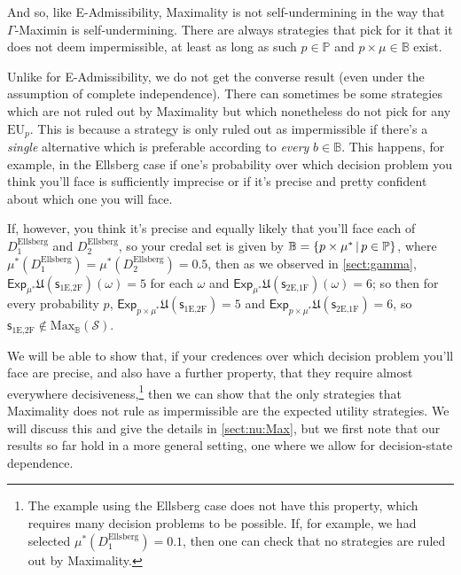 \documentclass[a4paper]{article}
\renewcommand\P{\mathbb{P}} %
\newcommand\Exp{\mathsf{Exp}}
\newcommand\EU{\mathrm{EU}}
\newcommand\U{\mathfrak{U}} %
\newcommand\Maximality{\mathrm{Max}}
\renewcommand\S{\mathcal{S}}
\newcommand\s{\mathsf{s}}
\newcommand{\IB}{\mathbb{B}}
\newcommand{\IP}{\P}
\renewcommand{\color}[1]{}
\newenvironment{colored}[1]{\leavevmode\color{#1}}{}
\newcommand{\Strategies}{\S}
\newcommand\SetDelimiter[1][]{
	\nonscript\,#1\vert \allowbreak \nonscript\,\mathopen{}}
\providecommand\given{\SetDelimiter}
\newenvironment{CCM rewritten}
{\begingroup\color{blue}} %
{\endgroup}              %
\begin{document}
And so, like E-Admissibility, Maximality is not self-undermining in the way that $\Gamma$-Maximin is self-undermining. There are always strategies that pick for it that it does not deem impermissible, %
	at least as long as such $p\in\IP$ and $p\times\mu\in\IB$ exist.

Unlike for E-Admissibility, we do not get the converse result (even under the assumption of complete independence). There can sometimes be some strategies which are not ruled out by Maximality but which nonetheless do not pick for any $\EU_p$. This is because a strategy is only ruled out as impermissible if there's a \emph{single} alternative which is preferable according to \emph{every} $b\in \IB$. 
This happens, for example, in the Ellsberg case if one's probability over which decision problem you think you'll face is sufficiently imprecise or if it's precise and pretty confident about which one you will face. 

If, however, you think it's precise and equally likely that you'll face each of $D^{\mathrm{Ellsberg}}_1$ and $D^{\mathrm{Ellsberg}}_2$, so your credal set is given by $\IB=\{p\times\mu^*\given p\in\IP\}$, where $\mu^*(D^{\mathrm{Ellsberg}}_1)=\mu^*(D^{\mathrm{Ellsberg}}_2)=0.5$, then as we observed in \cref{sect:gamma}, $\Exp_{\mu^*}\U(\s_{\text{1E,2F}})(\omega)=5$ for each $\omega$ and $\Exp_{\mu^*}\U(\s_{\text{2E,1F}})(\omega)=6$; so then for every probability $p$, $\Exp_{p\times\mu^*}\U(\s_{\text{1E,2F}})=5$ and $\Exp_{p\times\mu^*}\U(\s_{\text{2E,1F}})=6$, so  $\s_{\text{1E,2F}}\notin\Maximality_\IB(\Strategies)$. 

We will be able to show that, if your credences over which decision problem you'll face are precise, and also have a further property, that they require almost everywhere decisiveness,\footnote{The example using the Ellsberg case does not have this property, which requires many decision problems to be possible. If, for example, we had selected $\mu^*(D^{\mathrm{Ellsberg}}_1)=0.1$, then one can check that no strategies are ruled out by Maximality.} then we can show that the only strategies that Maximality does not rule as impermissible are the expected utility strategies. We will discuss this and give the details in \cref{sect:nu:Max}, but we first note that our results so far hold in a more general setting, one where we allow for decision-state dependence. 
\end{document}

